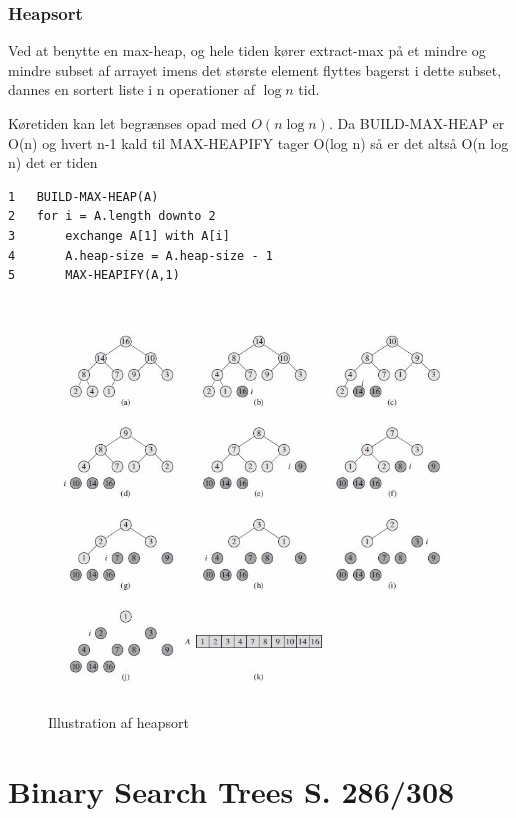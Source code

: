 \documentclass[11pt,a4paper]{report}
\theoremstyle{plain}
\theoremstyle{definition}
\theoremstyle{remark}
\numberwithin{equation}{section}
\begin{document}
\subsection{Heapsort}
Ved at benytte en max-heap, og hele tiden kører extract-max på et mindre og mindre subset af arrayet imens det største element flyttes bagerst i dette subset, dannes en sortert liste i n operationer af $\log n$ tid.

Køretiden kan let begrænses opad med $O(n \log n)$. Da BUILD-MAX-HEAP er O(n) og hvert n-1 kald til MAX-HEAPIFY tager O(log n) så er det altså O(n log n) det er tiden

\begin{lstlisting}
1   BUILD-MAX-HEAP(A)
2   for i = A.length downto 2
3       exchange A[1] with A[i]
4       A.heap-size = A.heap-size - 1
5       MAX-HEAPIFY(A,1)
\end{lstlisting}

\begin{figure}[H]
  \centering
  \includegraphics[scale=0.7]{heapsort.jpg}\\
  \caption{Illustration af heapsort}
\end{figure}


\chapter{Binary Search Trees S. 286/308}
\end{document}

